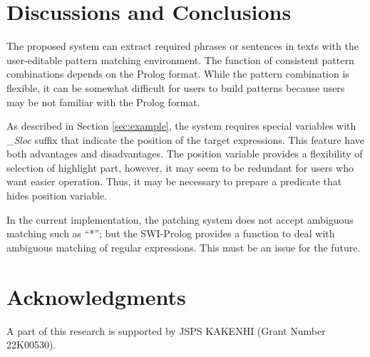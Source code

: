 \documentclass[conference]{IEEEtran}
\begin{document}
\section{Discussions and Conclusions}
The proposed system can extract required phrases or sentences in texts with the user-editable
pattern matching environment. The function of consistent pattern combinations depends on the Prolog format.
While the pattern combination is flexible, it can be somewhat difficult for users to build patterns
because users may be not familiar with the Prolog format.

As described in Section \ref{sec:example},
the system requires special variables with {\it \_Sloc} suffix that indicate the position of the
target expressions. This feature have both advantages and disadvantages. The position variable
provides a flexibility of selection of highlight part, however, it may seem to be redundant for
users who want easier operation. Thus, it may be necessary to prepare a predicate that hides
position variable.

In the current implementation, the patching system does not accept ambiguous matching such as ``*'';
but the SWI-Prolog provides a function to deal with ambiguous matching of regular expressions.
This must be an issue for the future.

\section*{Acknowledgments}
A part of this research is supported by JSPS KAKENHI (Grant Number 22K00530).





\end{document}
